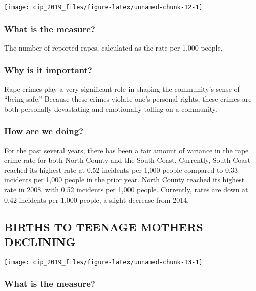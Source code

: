 \documentclass[]{book}
\theoremstyle{definition}
\theoremstyle{definition}
\theoremstyle{definition}
\theoremstyle{remark}
\begin{document}
\texttt{[image: cip\_2019\_files/figure-latex/unnamed-chunk-12-1]}

\subsubsection*{What is the measure?}\label{what-is-the-measure-4}

The number of reported rapes, calculated as the rate per 1,000 people.

\subsubsection*{Why is it important?}\label{why-is-it-important-3}

Rape crimes play a very significant role in shaping the community's
sense of ``being safe.'' Because these crimes violate one's personal
rights, these crimes are both personally devastating and emotionally
tolling on a community.

\subsubsection*{How are we doing?}\label{how-are-we-doing-6}

For the past several years, there has been a fair amount of variance in
the rape crime rate for both North County and the South Coast.
Currently, South Coast reached its highest rate at 0.52 incidents per
1,000 people compared to 0.33 incidents per 1,000 people in the prior
year. North County reached its highest rate in 2008, with 0.52 incidents
per 1,000 people. Currently, rates are down at 0.42 incidents per 1,000
people, a slight decrease from 2014.

\subsection*{BIRTHS TO TEENAGE MOTHERS
DECLINING}\label{births-to-teenage-mothers-declining}

\texttt{[image: cip\_2019\_files/figure-latex/unnamed-chunk-13-1]}

\subsubsection*{What is the measure?}\label{what-is-the-measure-5}
\end{document}
